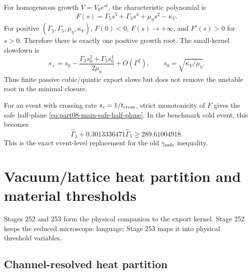 For homogeneous growth \(V=V_0e^{st}\), the characteristic polynomial is
\begin{equation}
\label{eq:part08-stage251-characteristic}
F(s)=\Gamma_5s^5+\Gamma_3s^3+\mu_\eta s^2-\kappa_V.
\end{equation}
For positive \((\Gamma_3,\Gamma_5,\mu_\eta,\kappa_V)\), \(F(0)<0\), \(F(s)\to+\infty\), and \(F'(s)>0\) for \(s>0\).  Therefore there is exactly one positive growth root.  The small-kernel slowdown is
\begin{equation}
\label{eq:part08-stage251-small-kernel}
s_+=s_0-\frac{\Gamma_3s_0^2+\Gamma_5s_0^4}{2\mu_\eta}+O(\Gamma^2),
\qquad
s_0=\sqrt{\kappa_V/\mu_\eta}.
\end{equation}
Thus finite passive cubic/quintic export slows but does not remove the unstable root in the minimal closure.

For an event with crossing rate \(s_c=1/t_{\rm cross}\), strict monotonicity of \(F\) gives the safe half-plane \cref{eq:part08-main-safe-half-plane}.  In the benchmark cold event, this becomes
\begin{equation}
\label{eq:part08-stage251-benchmark-half-plane}
\widehat\Gamma_3+0.3013336471\widehat\Gamma_5\ge 289.61004918.
\end{equation}
This is the exact event-level replacement for the old \(\gamma_{\rm safe}\) inequality.

\section{Vacuum/lattice heat partition and material thresholds}
\label{sec:part08_relaxed_branch:vacuum-lattice-heat-partition-and-material-thresho}

Stages 252 and 253 form the physical companion to the export kernel.  Stage 252 keeps the reduced microscopic language; Stage 253 maps it into physical threshold variables.

\subsection{Channel-resolved heat partition}
\label{subsec:part08-stage252-heat-partition}

